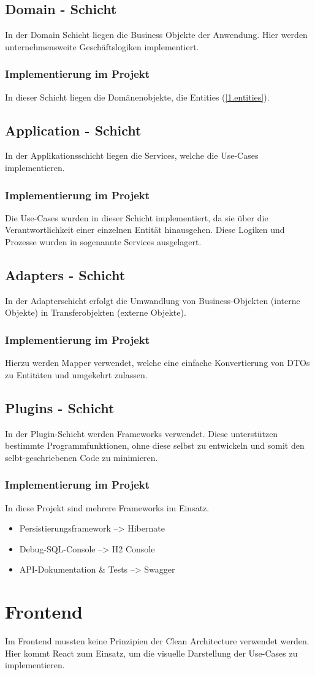     	\subsection{Domain - Schicht}
    	In der Domain Schicht liegen die Business Objekte der Anwendung. Hier werden unternehmensweite Geschäftslogiken implementiert.
    		\subsubsection{Implementierung im Projekt}
    		In dieser Schicht liegen die Domänenobjekte, die Entities (\cref{1.entities}).
    	
    	\subsection{Application - Schicht}
    	In der Applikationsschicht liegen die Services, welche die Use-Cases implementieren.
    		\subsubsection{Implementierung im Projekt}
    		Die Use-Cases wurden in dieser Schicht implementiert, da sie über die Verantwortlichkeit einer einzelnen Entität hinausgehen. Diese Logiken und Prozesse wurden in sogenannte Services ausgelagert.
    	
    	\subsection{Adapters - Schicht}
    	In der Adapterschicht erfolgt die Umwandlung von Business-Objekten (interne Objekte) in Transferobjekten (externe Objekte).
    		\subsubsection{Implementierung im Projekt}
    		Hierzu werden Mapper verwendet, welche eine einfache Konvertierung von DTOs zu Entitäten und umgekehrt zulassen.
    		
    	\subsection{Plugins - Schicht}
    	In der Plugin-Schicht werden Frameworks verwendet. Diese unterstützen bestimmte Programmfunktionen, ohne diese selbst zu entwickeln und somit den selbt-geschriebenen Code zu minimieren.
    	    \subsubsection{Implementierung im Projekt}
    	    In diese Projekt sind mehrere Frameworks im Einsatz. \\
    	    \begin{itemize}
    	        \item Persistierungsframework --> Hibernate
    	        \item Debug-SQL-Console --> H2 Console
    	        \item API-Dokumentation \& Tests --> Swagger
    	    \end{itemize}

    \section{Frontend}
    Im Frontend mussten keine Prinzipien der Clean Architecture verwendet werden. Hier kommt React zum Einsatz, um die visuelle Darstellung der Use-Cases zu implementieren.